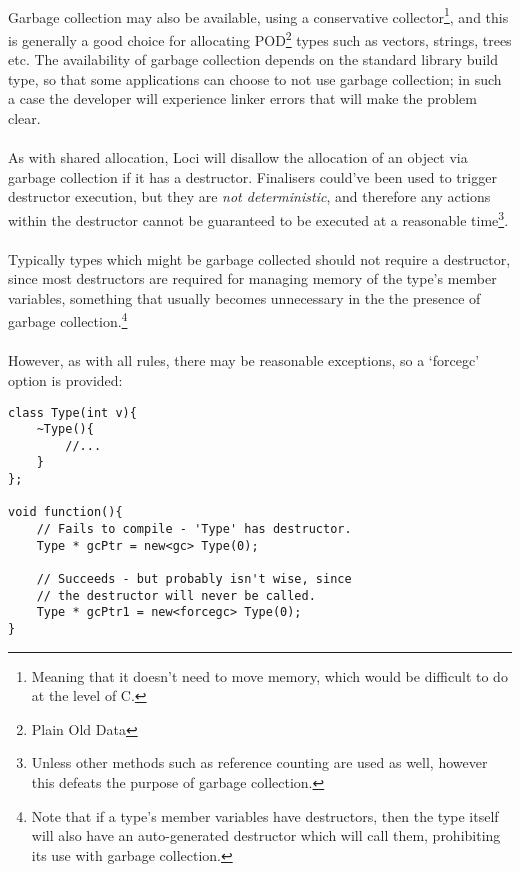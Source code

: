 \documentclass[12pt,twoside,notitlepage]{report}
\begin{document}
\paragraph{}
Garbage collection may also be available, using a conservative collector\footnote{Meaning that it doesn't need to move memory, which would be difficult to do at the level of C.}, and this is generally a good choice for allocating POD\footnote{Plain Old Data} types such as vectors, strings, trees etc. The availability of garbage collection depends on the standard library build type, so that some applications can choose to not use garbage collection; in such a case the developer will experience linker errors that will make the problem clear.

\paragraph{}
As with shared allocation, Loci will disallow the allocation of an object via garbage collection if it has a destructor. Finalisers could've been used to trigger destructor execution, but they are \emph{not deterministic}, and therefore any actions within the destructor cannot be guaranteed to be executed at a reasonable time\footnote{Unless other methods such as reference counting are used as well, however this defeats the purpose of garbage collection.}.

\paragraph{}
Typically types which might be garbage collected should not require a destructor, since most destructors are required for managing memory of the type's member variables, something that usually becomes unnecessary in the the presence of garbage collection.\footnote{Note that if a type's member variables have destructors, then the type itself will also have an auto-generated destructor which will call them, prohibiting its use with garbage collection.}

\paragraph{}
However, as with all rules, there may be reasonable exceptions, so a `forcegc' option is provided:


\begin{lstlisting}
class Type(int v){
	~Type(){
		//...
	}
};

void function(){
	// Fails to compile - 'Type' has destructor.
	Type * gcPtr = new<gc> Type(0);
	
	// Succeeds - but probably isn't wise, since 
	// the destructor will never be called.
	Type * gcPtr1 = new<forcegc> Type(0);
}
\end{lstlisting}
\end{document}
